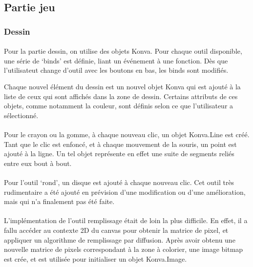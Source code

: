 \documentclass[11pt,a4paper]{article}
\begin{document}
        \subsection{Partie jeu}
            \subsubsection{Dessin}
                \paragraph{}
                Pour la partie dessin, on utilise des objets Konva.
                Pour chaque outil disponible, une série de `binds' est définie,
                liant un événement à une fonction.
                Dès que l'utilisateut change d'outil avec les boutons en bas, les binds sont modifiés.

                Chaque nouvel élément du dessin est un nouvel objet Konva
                qui est ajouté à la liste de ceux qui sont affichés dans la zone de dessin.
                Certains attributs de ces objets, comme notamment la couleur,
                sont définis selon ce que l'utilisateur a sélectionné.
                \paragraph{}
                Pour le crayon ou la gomme, à chaque nouveau clic, un objet Konva.Line est créé.
                Tant que le clic est enfoncé, et à chaque mouvement de la souris, un point est ajouté à la ligne.
                Un tel objet représente en effet une suite de segments reliés entre eux bout à bout.
                \paragraph{}
                Pour l'outil `rond', un disque est ajouté à chaque nouveau clic.
                Cet outil très rudimentaire a été ajouté en prévision d'une modification ou d'une amélioration,
                mais qui n'a finalement pas été faite.
                \paragraph{}
                L'implémentation de l'outil remplissage était de loin la plus difficile.
                En effet, il a fallu accéder au contexte 2D du canvas pour obtenir la matrice de pixel,
                et appliquer un algorithme de remplissage par diffusion.
                Après avoir obtenu une nouvelle matrice de pixels correspondant à la zone à colorier,
                une image bitmap est crée, et est utilisée pour initialiser un objet Konva.Image.
\end{document}
